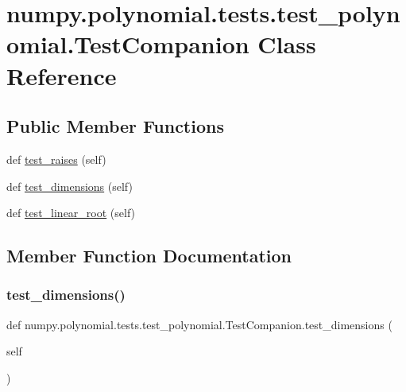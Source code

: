 \hypertarget{classnumpy_1_1polynomial_1_1tests_1_1test__polynomial_1_1TestCompanion}{}\section{numpy.\+polynomial.\+tests.\+test\+\_\+polynomial.\+Test\+Companion Class Reference}
\label{classnumpy_1_1polynomial_1_1tests_1_1test__polynomial_1_1TestCompanion}
\subsection*{Public Member Functions}
\begin{DoxyCompactItemize}
\item 
def \hyperlink{classnumpy_1_1polynomial_1_1tests_1_1test__polynomial_1_1TestCompanion_a0f7d66bb0d0115cdc31aed3ac27e0ad8}{test\+\_\+raises} (self)
\item 
def \hyperlink{classnumpy_1_1polynomial_1_1tests_1_1test__polynomial_1_1TestCompanion_a7a1a53e717def051db6cbe0e2c5c5d47}{test\+\_\+dimensions} (self)
\item 
def \hyperlink{classnumpy_1_1polynomial_1_1tests_1_1test__polynomial_1_1TestCompanion_a415e15f0caebbf6a00e2cf978b86b6b9}{test\+\_\+linear\+\_\+root} (self)
\end{DoxyCompactItemize}


\subsection{Member Function Documentation}
\mbox{\label{classnumpy_1_1polynomial_1_1tests_1_1test__polynomial_1_1TestCompanion_a7a1a53e717def051db6cbe0e2c5c5d47}} 
\subsubsection{\texorpdfstring{test\+\_\+dimensions()}{test\_dimensions()}}
{\footnotesize\ttfamily def numpy.\+polynomial.\+tests.\+test\+\_\+polynomial.\+Test\+Companion.\+test\+\_\+dimensions (\begin{DoxyParamCaption}\item[{}]{self }\end{DoxyParamCaption})}

